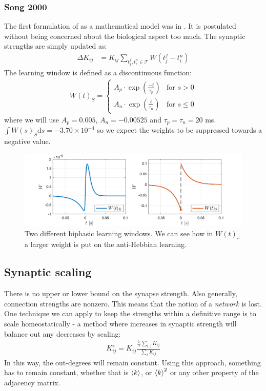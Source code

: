 \subsubsection{Song 2000}
The first formulation of \STDP as a mathematical model was in \cite{Song2000}. It is postulated without being concerned about the biological aspect too much. The synaptic strengths are simply updated as:
\begin{align}
\Delta K_{ij} &= K_{ij} \sum_{t_{j}^{f}, t_i^{n} \in \mathcal{T}} W (t_{j}^{f}-t_i^{n} ) \label{eq:SongSTDPFormulation}
\end{align}
The learning window is defined as a discontinuous function:
\begin{align}
W(t)_S =
\begin{cases}
A_{p} \cdot \exp \left(\frac{-t}{\tau_p}\right) & \text{for } s > 0 \\
A_{n} \cdot \exp \left(\frac{t}{\tau_n}\right)  & \text{for } s \leq 0
\end{cases} \label{eq:learningwindowKempter1999}
\end{align}
where we will use $A_p = 0.005$, $A_n = -0.00525$ and $\tau_p = \tau_n = 20$ ms. $\int W(s)_S \mathrm{d}s = -3.70 \times 10^{-4}$ so we expect the weights to be suppressed towards a negative value.

\begin{figure}[H]
\centering
\includegraphics[width = \textwidth]{../Figures/LearningWindowsBiphasic.png}
\caption{Two different biphasic learning windows. We can see how in $W(t)_s$ a larger weight is put on the anti-Hebbian learning.}
\label{fig:LearningWindowsBiphasic}
\end{figure}


\subsection{Synaptic scaling}
There is no upper or lower bound on the synapse strength. Also generally, connection strengths are nonzero. This means that the notion of a \textsl{network} is lost.\\
One technique we can apply to keep the strengths within a definitive range is to scale homeostatically - a method where increases in synaptic strength will balance out any decreases by scaling:
\begin{align}
K_{ij}^s = K_{ij} \frac{\frac{1}{N} \sum_{i,j} K_{ij}}{\sum_{i} K_{ij}}
\end{align}
In this way, the out-degrees will remain constant. Using this approach, something has to remain constant, whether that is ${\langle k\rangle}$, or ${\langle k\rangle}^2$ or any other property of the adjacency matrix.


